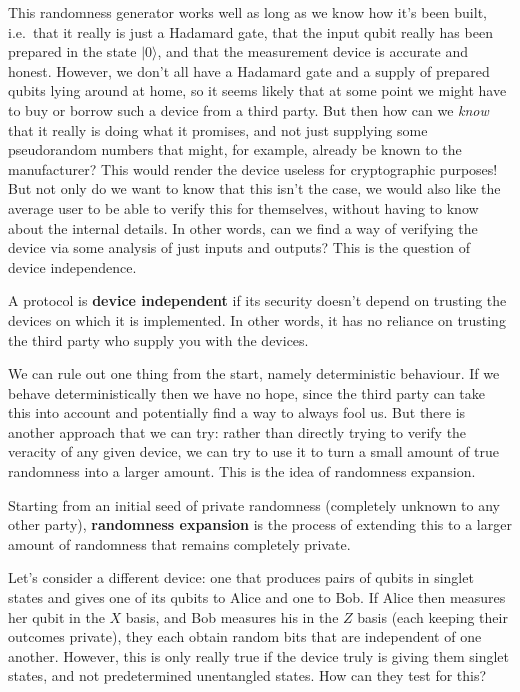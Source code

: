 \documentclass[fleqn,a4paper]{article}
\newenvironment{idea}{\everypar{\setlength{\parindent}{1.5em}}}{}
\theoremstyle{definition}
\theoremstyle{definition}
\theoremstyle{definition}
\theoremstyle{definition}
\theoremstyle{remark}
\begin{document}
This randomness generator works well as long as we know how it's been built, i.e.~that it really is just a Hadamard gate, that the input qubit really has been prepared in the state \(|0\rangle\), and that the measurement device is accurate and honest.
However, we don't all have a Hadamard gate and a supply of prepared qubits lying around at home, so it seems likely that at some point we might have to buy or borrow such a device from a third party.
But then how can we \emph{know} that it really is doing what it promises, and not just supplying some pseudorandom numbers that might, for example, already be known to the manufacturer?
This would render the device useless for cryptographic purposes!
But not only do we want to know that this isn't the case, we would also like the average user to be able to verify this for themselves, without having to know about the internal details.
In other words, can we find a way of verifying the device via some analysis of just inputs and outputs?
This is the question of device independence.

\begin{idea}
A protocol is \textbf{device independent} if its security doesn't depend on trusting the devices on which it is implemented.
In other words, it has no reliance on trusting the third party who supply you with the devices.

\end{idea}

We can rule out one thing from the start, namely deterministic behaviour.
If we behave deterministically then we have no hope, since the third party can take this into account and potentially find a way to always fool us.
But there is another approach that we can try: rather than directly trying to verify the veracity of any given device, we can try to use it to turn a small amount of true randomness into a larger amount.
This is the idea of randomness expansion.

\begin{idea}
Starting from an initial seed of private randomness (completely unknown to any other party), \textbf{randomness expansion} is the process of extending this to a larger amount of randomness that remains completely private.

\end{idea}

Let's consider a different device: one that produces pairs of qubits in singlet states and gives one of its qubits to Alice and one to Bob.
If Alice then measures her qubit in the \(X\) basis, and Bob measures his in the \(Z\) basis (each keeping their outcomes private), they each obtain random bits that are independent of one another.
However, this is only really true if the device truly is giving them singlet states, and not predetermined unentangled states.
How can they test for this?
\end{document}
